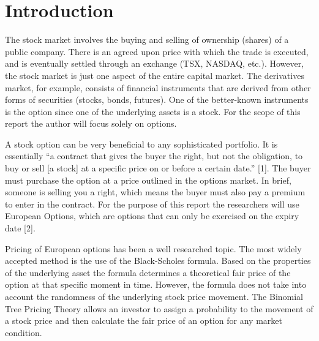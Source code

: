 \documentclass[12pt]{article}
\begin{document}



\newpage 
\doublespacing
{}
\setlength{\parindent}{1cm}

\section{Introduction}
The stock market involves the buying and selling of ownership (shares) of a public company.  There is an agreed upon price with which the trade is executed, and is eventually settled through an exchange (TSX, NASDAQ, etc.).  However, the stock market is just one aspect of the entire capital market. The derivatives market, for example, consists of financial instruments that are derived from other forms of securities (stocks, bonds, futures).  One of the better-known instruments is the option since one of the underlying assets is a stock. For the scope of this report the author will focus solely on options.

A stock option can be very beneficial to any sophisticated portfolio. It is essentially ``a contract that gives the buyer the right, but not the obligation, to buy or sell [a stock] at a specific price on or before a certain date.'' [1]. The buyer must purchase the option at a price outlined in the options market. In brief, someone is selling you a right, which means the buyer must also pay a premium to enter in the contract. For the purpose of this report the researchers will use European Options, which are options that can only be exercised on the expiry date [2]. 

Pricing of European options has been a well researched topic. The most widely accepted method is the use of the Black-Scholes formula. Based on the properties of the underlying asset the formula determines a theoretical fair price of the option at that specific moment in time. However, the formula does not take into account the randomness of the underlying stock price movement. The Binomial Tree Pricing Theory allows an investor to assign a probability to the movement of a stock price and then calculate the fair price of an option for any market condition. 
\end{document}
